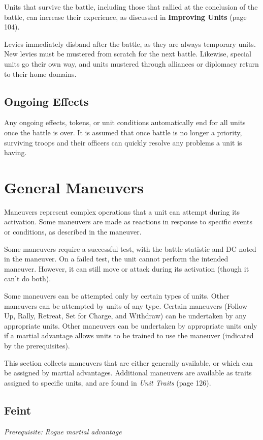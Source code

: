 \documentclass[10pt,a4paper,twoside,bg=print,twocolumn,openany,nodeprecatedcode]{dndbook}
\begin{document}
Units that survive the battle, including those that rallied at the conclusion of the battle, can increase their experience, as discussed in \textbf{Improving Units} (page 104).

Levies immediately disband after the battle, as they are always temporary units. New levies must be mustered from scratch for the next battle. Likewise, special units go their own way, and units mustered through alliances or diplomacy return to their home domains.

\subsection{Ongoing Effects}
Any ongoing effects, tokens, or unit conditions automatically end for all units once the battle is over. It is assumed that once battle is no longer a priority, surviving troops and their officers can quickly resolve any problems a unit is having.

\section{General Maneuvers}
Maneuvers represent complex operations that a unit can attempt during its activation. Some maneuvers are made as reactions in response to specific events or conditions, as described in the maneuver.

Some maneuvers require a successful test, with the battle statistic and DC noted in the maneuver. On a failed test, the unit cannot perform the intended maneuver. However, it can still move or attack during its activation (though it can't do both).

Some maneuvers can be attempted only by certain types of units. Other maneuvers can be attempted by units of any type. Certain maneuvers (Follow Up, Rally, Retreat, Set for Charge, and Withdraw) can be undertaken by any appropriate units. Other maneuvers can be undertaken by appropriate units only if a martial advantage allows units to be trained to use the maneuver (indicated by the prerequisites).

This section collects maneuvers that are either generally available, or which can be assigned by martial advantages. Additional maneuvers are available as traits assigned to specific units, and are found in \textit{Unit Traits} (page 126).

\subsection{Feint}
\textit{Prerequisite: Rogue martial advantage}
\end{document}
